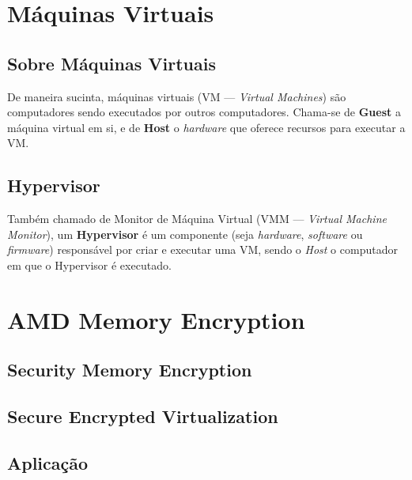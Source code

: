 \documentclass{report}
\title{\todo{A gente descobre depois}}
\author{João Gabriel Trombeta\\
        João Paulo Taylor Ienczak Zanette\\
        Ranieri Schroeder Althoff}
\date{\today}
\begin{document}
\maketitle

\tableofcontents

\chapter{Máquinas Virtuais}

\section{Sobre Máquinas Virtuais}

De maneira sucinta, máquinas virtuais (VM --- \textit{Virtual Machines}) são
computadores sendo executados por outros computadores. Chama-se de
\textbf{Guest} a máquina virtual em si, e de \textbf{Host} o \textit{hardware}
que oferece recursos para executar a VM\@.

\section{Hypervisor}

Também chamado de Monitor de Máquina Virtual (VMM --- \textit{Virtual Machine
Monitor}), um \textbf{Hypervisor} é um componente (seja \textit{hardware},
\textit{software} ou \textit{firmware}) responsável por criar e executar uma
VM, sendo o \textit{Host} o computador em que o Hypervisor é executado.

\chapter{AMD Memory Encryption}

\section{Security Memory Encryption}

\section{Secure Encrypted Virtualization}

\section{Aplicação}


\nocite{*}

\end{document}
